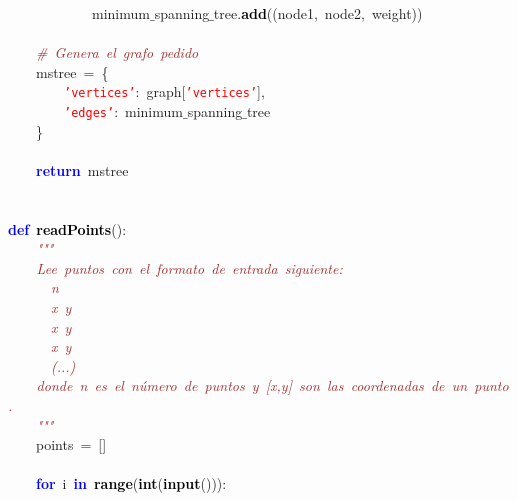 \mbox{}\ \ \ \ \ \ \ \ \ \ \ \ minimum$\_$spanning$\_$tree\textcolor{BrickRed}{.}\textbf{\textcolor{Black}{add}}\textcolor{BrickRed}{((}node1\textcolor{BrickRed}{,}\ node2\textcolor{BrickRed}{,}\ weight\textcolor{BrickRed}{))} \\
\mbox{} \\
\mbox{}\ \ \ \ \textit{\textcolor{Brown}{\#\ Genera\ el\ grafo\ pedido}} \\
\mbox{}\ \ \ \ mstree\ \textcolor{BrickRed}{=}\ \textcolor{BrickRed}{\{} \\
\mbox{}\ \ \ \ \ \ \ \ \texttt{\textcolor{Red}{'vertices'}}\textcolor{BrickRed}{:}\ graph\textcolor{BrickRed}{[}\texttt{\textcolor{Red}{'vertices'}}\textcolor{BrickRed}{],} \\
\mbox{}\ \ \ \ \ \ \ \ \texttt{\textcolor{Red}{'edges'}}\textcolor{BrickRed}{:}\ minimum$\_$spanning$\_$tree \\
\mbox{}\ \ \ \ \textcolor{BrickRed}{\}} \\
\mbox{} \\
\mbox{}\ \ \ \ \textbf{\textcolor{Blue}{return}}\ mstree \\
\mbox{} \\
\mbox{} \\
\mbox{}\textbf{\textcolor{Blue}{def}}\ \textbf{\textcolor{Black}{readPoints}}\textcolor{BrickRed}{():} \\
\mbox{}\textit{\textcolor{Brown}{\ \ \ \ "{}"{}"{}}} \\
\mbox{}\textit{\textcolor{Brown}{\ \ \ \ Lee\ puntos\ con\ el\ formato\ de\ entrada\ siguiente:}} \\
\mbox{}\textit{\textcolor{Brown}{\ \ \ \ \ \ n}} \\
\mbox{}\textit{\textcolor{Brown}{\ \ \ \ \ \ x\ y}} \\
\mbox{}\textit{\textcolor{Brown}{\ \ \ \ \ \ x\ y}} \\
\mbox{}\textit{\textcolor{Brown}{\ \ \ \ \ \ x\ y}} \\
\mbox{}\textit{\textcolor{Brown}{\ \ \ \ \ \ (...)}} \\
\mbox{}\textit{\textcolor{Brown}{\ \ \ \ donde\ n\ es\ el\ número\ de\ puntos\ y\ [x,y]\ son\ las\ coordenadas\ de\ un\ punto.}} \\
\mbox{}\textit{\textcolor{Brown}{\ \ \ \ "{}"{}"{}}} \\
\mbox{}\ \ \ \ points\ \textcolor{BrickRed}{=}\ \textcolor{BrickRed}{[]} \\
\mbox{} \\
\mbox{}\ \ \ \ \textbf{\textcolor{Blue}{for}}\ i\ \textbf{\textcolor{Blue}{in}}\ \textbf{\textcolor{Black}{range}}\textcolor{BrickRed}{(}\textbf{\textcolor{Black}{int}}\textcolor{BrickRed}{(}\textbf{\textcolor{Black}{input}}\textcolor{BrickRed}{())):} \\
